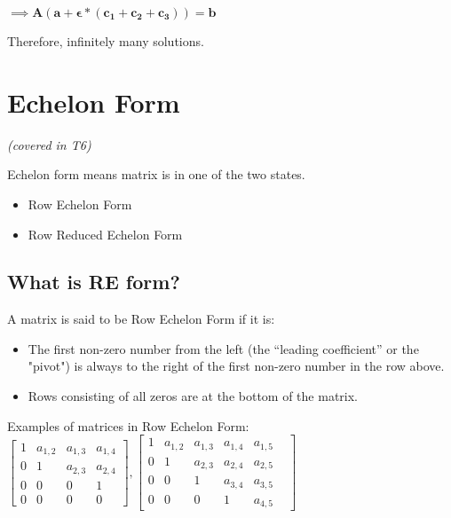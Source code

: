 \documentclass[a4paper]{article}
\begin{document}
\begin{center}
$
    \implies \mathbf{A(a+\epsilon*(\mathbf{c_1} + \mathbf{c_2} + \mathbf{c_3}))} = \mathbf{b}
$
\end{center}

Therefore, infinitely many solutions.


\section{Echelon Form}
\textit{(covered in T6)}

Echelon form means matrix is in one of the two states. 
\begin{itemize}
  \item Row Echelon Form
  \item Row Reduced Echelon Form
\end{itemize}


\subsection{What is RE form?}
A matrix is said to be Row Echelon Form if it is:
\begin{itemize}
  \item The first non-zero number from the left (the “leading coefficient” or the "pivot") is always to the right of the first non-zero number in the row above.
  \item Rows consisting of all zeros are at the bottom of the matrix.
\end{itemize}
Examples of matrices in Row Echelon Form:
$ 
    \begin{bmatrix}
    1 & a_{1,2} & a_{1,3} & a_{1,4} \\ 
    0 & 1 &  a_{2,3} & a_{2,4} \\
    0 & 0 & 0  &    1  \\
    0 & 0 & 0 & 0 
    \end{bmatrix}
    ,
    \begin{bmatrix}
    1 & a_{1,2} & a_{1,3} & a_{1,4} & a_{1,5} \\ 
    0 & 1 &  a_{2,3} & a_{2,4} & a_{2,5} \\
    0 & 0 & 1  & a_{3,4} & a_{3,5}  \\
    0 & 0 & 0 & 1 &  a_{4,5} &
    \end{bmatrix}
$

\newpage
\end{document}
